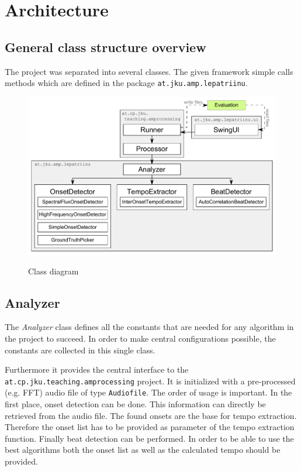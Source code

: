 \chapter{Architecture} \label{cpt:architecture}

\section{General class structure overview} \label{sec:classes}
The project was separated into several classes. The given framework simple calls
methods which are defined in the package \texttt{at.jku.amp.lepatriinu}.

\begin{figure}[htp]
  \centering
  \includegraphics[width=\textwidth]{chapter/ClassDiagram}
  \label{fig:classdiagram}
  \caption{Class diagram}
\end{figure}

\section{\ttfamily Analyzer} \label{sec:analyzer}
The \emph{Analyzer} class defines all the constants that are needed for any
algorithm in the project to succeed. In order to make central configurations
possible, the constants are collected in this single class.

Furthermore it provides the central interface to the
\texttt{at.cp.jku.teaching.am\-pro\-ces\-sing} project. It is initialized with a
pre-processed (e.g. FFT) audio file of type \texttt{Audiofile}. The order of
usage is important. In the first place, onset detection can be done. This
information can directly be retrieved from the audio file. The found onsets are
the base for tempo extraction. Therefore the onset list has to be provided as
parameter of the tempo extraction function. Finally beat detection can be
performed. In order to be able to use the best algorithms both the onset list as
well as the calculated tempo should be provided.

